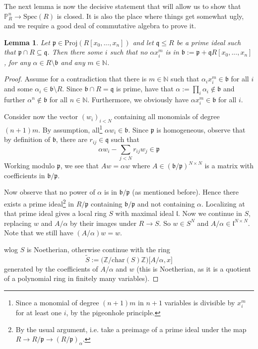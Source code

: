 \documentclass{scrartcl}
\newcommand{\N}{\mathbb{N}}
\newcommand{\Z}{\mathbb{Z}}
\renewcommand{\P}{\mathbb{P}}
\newcommand{\p}{\mathfrak{p}}
\newcommand{\q}{\mathfrak{q}}
\renewcommand{\b}{\mathfrak{b}}
\newcommand{\Spec}{\mathrm{Spec}}
\newcommand{\Proj}{\mathrm{Proj}}
\newtheorem{lemma}[subsection]{Lemma}
\theoremstyle{definition}
\begin{document}
The next lemma is now the decisive statement that will allow us to show that $\P_R^n \to \Spec(R)$ is closed.
It is also the place where things get somewhat ugly, and we require a good deal of commutative algebra to prove it.
\begin{lemma}
    \label{prop:adding_coeff_ideal_does_not_introduce_irrelevant_ideal}
    Let $\p \in \Proj(R[x_0, ..., x_n])$ and let $\q \leq R$ be a prime ideal such that $\p \cap R \subseteq \q$.
    Then there some $i$ such that no $\alpha x_i^m$ is in $\b := \p + \q R[x_0, ..., x_n]$, for any $\alpha \in R \setminus \b$ and any $m \in \N$.
\end{lemma}
\begin{proof}
    Assume for a contradiction  that there is $m \in \N$ such that $\alpha_i x_i^m \in \b$ for all $i$ and some $\alpha_i \in \b \setminus R$.
    Since $\b \cap R = \q$ is prime, have that $\alpha := \prod_i \alpha_i \notin \b$ and further $\alpha^n \notin \b$ for all $n \in \N$.
    Furthermore, we obviously have $\alpha x_i^m \in \b$ for all $i$.

    Consider now the vector $(w_i)_{i < N}$ containing all monomials of degree $(n + 1)m$.
    By assumption, all\footnote{Since a monomial of degree $(n + 1)m$ in $n + 1$ variables is divisible by $x_i^m$ for at least one $i$, by the pigeonhole principle.} $\alpha w_i \in \b$.
    Since $\p$ is homogeneous, observe that by definition of $\b$, there are $r_{ij} \in \q$ such that
    \begin{equation*}
        \alpha w_i - \sum_{j < N} r_{i j} w_j \in \p
    \end{equation*}
    Working modulo $\p$, we see that $A w = \alpha w$ where $A \in (\b/\p)^{N \times N}$ is a matrix with coefficients in $\b/\p$.

    Now observe that no power of $\alpha$ is in $\b/\p$ (as mentioned before).
    Hence there exists a prime ideal\footnote{By the usual argument, i.e. take a preimage of a prime ideal under the map $R \to R/\p \to (R/\p)_\alpha$.} in $R/\p$ containing $\b/\p$ and not containing $\alpha$.
    Localizing at that prime ideal gives a local ring $S$ with maximal ideal $\mathfrak{l}$.
    Now we continue in $S$, replacing $w$ and $A/\alpha$ by their images under $R \to S$.
    So $w \in S^N$ and $A/\alpha \in \mathfrak{l}^{N \times N}$.
    Note that we still have $(A/\alpha) w = w$.

    wlog $S$ is Noetherian, otherwise continue with the ring
    \begin{equation*}
        \tilde{S} := \bigl( \Z / \mathrm{char}(S) \Z \bigr) \bigl[ A/\alpha, x \bigr]
    \end{equation*}
    generated by the coefficients of $A/\alpha$ and $w$ (this is Noetherian, as it is a quotient of a polynomial ring in finitely many variables).
    

\end{proof}
\end{document}

